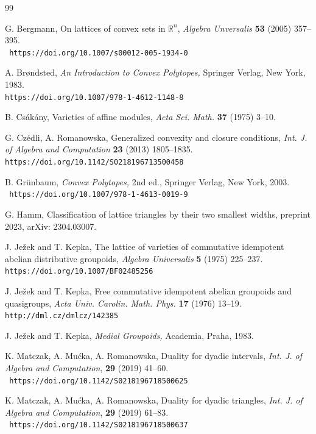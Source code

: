 \documentclass[12pt]{amsart}
\def\mbR{\mathbb{R}}
\theoremstyle{plain}
\theoremstyle{definition}
\numberwithin{equation}{section}
\begin{document}
\begin{thebibliography}{99}

G. Bergmann,
On lattices of convex sets in $\mbR^n$,
{\em Algebra Unversalis} {\bf53} (2005) 357--395.\\ \texttt{ https://doi.org/10.1007/s00012-005-1934-0}

A. Br\o ndsted,
    {\em An Introduction to Convex Polytopes,}
    Springer Verlag, New York, 1983.\\
\texttt{https://doi.org/10.1007/978-1-4612-1148-8}


B. Cs\'{a}k\'{a}ny,
Varieties of affine modules,
{\em Acta Sci. Math.} {\bf 37} (1975) 3--10.


G. Cz\'{e}dli, A. Romanowska,
Generalized convexity and closure conditions,
{\em Int. J. of Algebra and Computation} {\bf 23} (2013) 1805--1835.
\\ \texttt{https://doi.org/10.1142/S0218196713500458}

B. Gr\"{u}nbaum,
    {\em Convex Polytopes,}
    2nd ed., Springer Verlag, New York, 2003.
\\ \texttt{ https://doi.org/10.1007/978-1-4613-0019-9 }


G. Hamm,
Classification of lattice triangles by their two smallest widths, preprint 2023, arXiv: 2304.03007.
	

J. Je\v{z}ek and T. Kepka,
The lattice of varieties of commutative idempotent abelian distributive groupoids,
{\em Algebra Universalis} {\bf 5} (1975) 225--237.
\\ \texttt{https://doi.org/10.1007/BF02485256  }

J. Je\v{z}ek and T. Kepka,
Free commutative idempotent abelian groupoids and quasigroups,
{\em Acta Univ. Carolin. Math. Phys.} {\bf 17} (1976) 13--19.\\
\texttt{http://dml.cz/dmlcz/142385}

J. Je\v{z}ek and T. Kepka,
{\em Medial Groupoids,}
Academia, Praha, 1983.


K. Matczak, A. Mu\'{c}ka, A. Romanowska,
Duality for dyadic intervals,
{\em Int. J. of Algebra and Computation},  {\bf 29} (2019) 41--60.
\\ \texttt{ https://doi.org/10.1142/S0218196718500625 }

K. Matczak, A. Mu\'{c}ka, A. Romanowska,
Duality for dyadic triangles,
{\em Int. J. of Algebra and Computation}, {\bf 29} (2019) 61--83.
\\ \texttt{ https://doi.org/10.1142/S0218196718500637 }


\end{thebibliography}
\end{document}
